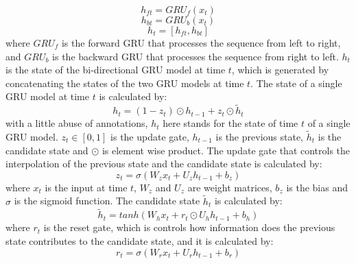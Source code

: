 \begin{equation}
h_{ft} = GRU_f(x_{t})
\end{equation}
\begin{equation}
h_{bt} = GRU_b(x_{t})
\end{equation}
\begin{equation}
h_t = [h_{ft}, h_{bt}]
\end{equation}
where $GRU_f$ is the forward GRU that processes the sequence from left to right, and $GRU_b$ is the backward GRU that processes the sequence from right to left. $h_t$ is the state of the bi-directional GRU model at time $t$, which is generated by concatenating the states of the two GRU models at time $t$. The state of a single GRU model at time $t$ is calculated by: 
\begin{equation}
h_t=(1-z_t)\odot h_{t-1} + z_t\odot \tilde{h}_{t}
\end{equation}
with a little abuse of annotations, $h_t$ here stands for the state of time $t$ of a single GRU model. $z_t\in{[0,1]}$ is the update gate, $h_{t-1}$ is the previous state, $\tilde{h}_{t}$ is the candidate state and $\odot$ is element wise product. The update gate that controls the interpolation of the previous state and the candidate state is calculated by:
 \begin{equation}
z_t=\sigma(W_z x_t+U_z h_{t-1} + b_z)
\end{equation}
where $x_t$ is the input at time $t$, $W_z$ and $U_z$ are weight matrices, $b_z$ is the bias and $\sigma$ is the sigmoid function. The candidate state $\tilde{h}_{t}$ is calculated by:
\begin{equation}
\tilde{h}_{t}=tanh(W_h x_t + r_t\odot U_h h_{t-1} + b_h)
\end{equation}
where $r_t$ is the reset gate, which is controls how information does the previous state contributes to the candidate state, and it is calculated by:
\begin{equation}
r_t=\sigma(W_r x_t + U_r h_{t-1} + b_r)
\end{equation}

